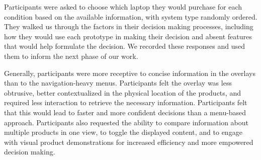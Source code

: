 Participants were asked to choose which laptop they would purchase for each condition based on the available information, with system type randomly ordered. 
They walked us through the factors in their decision making processes, including how they would use each prototype in making their decision and absent features that would help formulate the decision. We recorded these responses and used them to inform the next phase of our work. 

Generally, participants were more receptive to concise information in the overlays than to the navigation-heavy menus. Participants felt the overlay was less obtrusive, better contextualized in the physical location of the products, and required less interaction to retrieve the necessary information. Participants felt that this would lead to faster and more confident decisions than a menu-based approach. 
Participants also requested the ability to compare information about multiple products in one view, to toggle the displayed content, and to engage with visual product demonstrations for increased efficiency and more empowered decision making.

